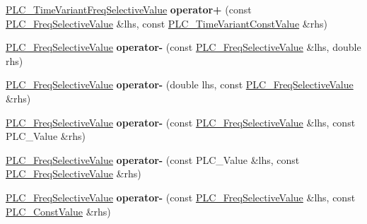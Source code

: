 \begin{DoxyCompactItemize}
\item 
\hypertarget{classns3_1_1PLC__FreqSelectiveValue_a2af198eff18574f291b5ecdbfd131851}{\hyperlink{classns3_1_1PLC__TimeVariantFreqSelectiveValue}{\-P\-L\-C\-\_\-\-Time\-Variant\-Freq\-Selective\-Value} {\bfseries operator+} (const \hyperlink{classns3_1_1PLC__FreqSelectiveValue}{\-P\-L\-C\-\_\-\-Freq\-Selective\-Value} \&lhs, const \hyperlink{classns3_1_1PLC__TimeVariantConstValue}{\-P\-L\-C\-\_\-\-Time\-Variant\-Const\-Value} \&rhs)}\label{classns3_1_1PLC__FreqSelectiveValue_a2af198eff18574f291b5ecdbfd131851}

\item 
\hypertarget{classns3_1_1PLC__FreqSelectiveValue_acbee783e36112983c1a8287dd8a924d3}{\hyperlink{classns3_1_1PLC__FreqSelectiveValue}{\-P\-L\-C\-\_\-\-Freq\-Selective\-Value} {\bfseries operator-\/} (const \hyperlink{classns3_1_1PLC__FreqSelectiveValue}{\-P\-L\-C\-\_\-\-Freq\-Selective\-Value} \&lhs, double rhs)}\label{classns3_1_1PLC__FreqSelectiveValue_acbee783e36112983c1a8287dd8a924d3}

\item 
\hypertarget{classns3_1_1PLC__FreqSelectiveValue_a28e904f0e6612efe8dd9932274aaf9f7}{\hyperlink{classns3_1_1PLC__FreqSelectiveValue}{\-P\-L\-C\-\_\-\-Freq\-Selective\-Value} {\bfseries operator-\/} (double lhs, const \hyperlink{classns3_1_1PLC__FreqSelectiveValue}{\-P\-L\-C\-\_\-\-Freq\-Selective\-Value} \&rhs)}\label{classns3_1_1PLC__FreqSelectiveValue_a28e904f0e6612efe8dd9932274aaf9f7}

\item 
\hypertarget{classns3_1_1PLC__FreqSelectiveValue_ad8a368feadd7e576d0318c9b48101907}{\hyperlink{classns3_1_1PLC__FreqSelectiveValue}{\-P\-L\-C\-\_\-\-Freq\-Selective\-Value} {\bfseries operator-\/} (const \hyperlink{classns3_1_1PLC__FreqSelectiveValue}{\-P\-L\-C\-\_\-\-Freq\-Selective\-Value} \&lhs, const \-P\-L\-C\-\_\-\-Value \&rhs)}\label{classns3_1_1PLC__FreqSelectiveValue_ad8a368feadd7e576d0318c9b48101907}

\item 
\hypertarget{classns3_1_1PLC__FreqSelectiveValue_ac983a169bad88bbd1c9d67963f341667}{\hyperlink{classns3_1_1PLC__FreqSelectiveValue}{\-P\-L\-C\-\_\-\-Freq\-Selective\-Value} {\bfseries operator-\/} (const \-P\-L\-C\-\_\-\-Value \&lhs, const \hyperlink{classns3_1_1PLC__FreqSelectiveValue}{\-P\-L\-C\-\_\-\-Freq\-Selective\-Value} \&rhs)}\label{classns3_1_1PLC__FreqSelectiveValue_ac983a169bad88bbd1c9d67963f341667}

\item 
\hypertarget{classns3_1_1PLC__FreqSelectiveValue_ac355559b2fb991a6da6122f090fca681}{\hyperlink{classns3_1_1PLC__FreqSelectiveValue}{\-P\-L\-C\-\_\-\-Freq\-Selective\-Value} {\bfseries operator-\/} (const \hyperlink{classns3_1_1PLC__FreqSelectiveValue}{\-P\-L\-C\-\_\-\-Freq\-Selective\-Value} \&lhs, const \hyperlink{classns3_1_1PLC__ConstValue}{\-P\-L\-C\-\_\-\-Const\-Value} \&rhs)}\label{classns3_1_1PLC__FreqSelectiveValue_ac355559b2fb991a6da6122f090fca681}


\end{DoxyCompactItemize}
